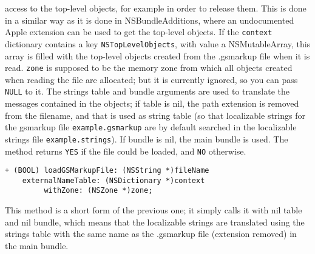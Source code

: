 access to the top-level objects, for example in order to release them.
This is done in a similar way as it is done in NSBundleAdditions,
where an undocumented Apple extension can be used to get the top-level
objects.  If the \texttt{context} dictionary contains a key
\texttt{NSTopLevelObjects}, with value a NSMutableArray, this array is
filled with the top-level objects created from the .gsmarkup file when it
is read.  \texttt{zone} is supposed to be the memory zone from which
all objects created when reading the file are allocated; but it is
currently ignored, so you can pass \texttt{NULL} to it.  The strings
table and bundle arguments are used to translate the messages
contained in the objects; if table is nil, the path extension is
removed from the filename, and that is used as string table (so that
localizable strings for the gsmarkup file \texttt{example.gsmarkup} are by
default searched in the localizable strings file
\texttt{example.strings}).  If bundle is nil, the main bundle is used.
The method returns \texttt{YES} if the file could be loaded, and
\texttt{NO} otherwise.

\begin{verbatim}
+ (BOOL) loadGSMarkupFile: (NSString *)fileName
    externalNameTable: (NSDictionary *)context
	     withZone: (NSZone *)zone;
\end{verbatim}
This method is a short form of the previous one; it simply calls it
with nil table and nil bundle, which means that the localizable
strings are translated using the strings table with the same name as
the .gsmarkup file (extension removed) in the main bundle.

